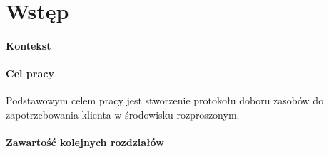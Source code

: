 \chapter{Wstęp}

\subsubsection{Kontekst}
\subsubsection{Cel pracy}

Podstawowym celem pracy jest stworzenie protokołu doboru zasobów do zapotrzebowania klienta w środowisku rozproszonym.

\subsubsection{Zawartość kolejnych rozdziałów}
